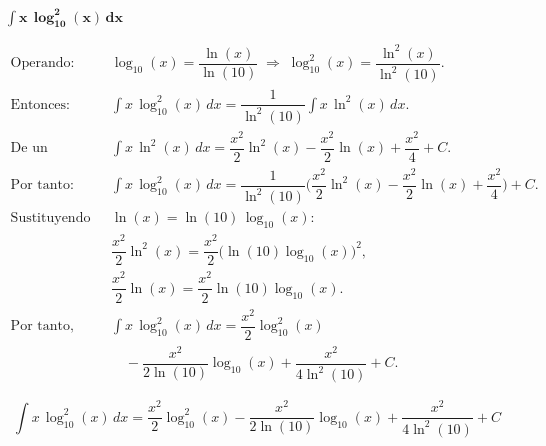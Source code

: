 $\displaystyle \mathbf{\int x\,\log_{10}^{2}(x)\,dx}$

\nopagebreak
$$
\begin{aligned}
\text{Operando: } &
\log_{10}(x) = \dfrac{\ln(x)}{\ln(10)} 
\;\Rightarrow\;
\log_{10}^{2}(x) = \dfrac{\ln^{2}(x)}{\ln^{2}(10)}. \\[6pt]
\text{Entonces: } &
\int x\,\log_{10}^{2}(x)\,dx
= \dfrac{1}{\ln^{2}(10)}\int x\,\ln^{2}(x)\,dx. \\[6pt]
\text{De un resultado previo (por partes): } &
\int x\,\ln^{2}(x)\,dx
= \dfrac{x^{2}}{2}\ln^{2}(x)
- \dfrac{x^{2}}{2}\ln(x)
+ \dfrac{x^{2}}{4} + C. \\[6pt]
\text{Por tanto: } &
\int x\,\log_{10}^{2}(x)\,dx
= \dfrac{1}{\ln^{2}(10)}
\Bigg(
\dfrac{x^{2}}{2}\ln^{2}(x)
- \dfrac{x^{2}}{2}\ln(x)
+ \dfrac{x^{2}}{4}
\Bigg) + C. \\[6pt]
\text{Sustituyendo } &\ln(x)=\ln(10)\,\log_{10}(x): \\[6pt]
&\dfrac{x^{2}}{2}\ln^{2}(x)
= \dfrac{x^{2}}{2}\big(\ln(10)\log_{10}(x)\big)^{2}, \\[3pt]
&\dfrac{x^{2}}{2}\ln(x)
= \dfrac{x^{2}}{2}\ln(10)\log_{10}(x). \\[8pt]
\text{Por tanto, simplificando: } &
\int x\,\log_{10}^{2}(x)\,dx
= \dfrac{x^{2}}{2}\log_{10}^{2}(x) \\[4pt]
&\quad - \dfrac{x^{2}}{2\ln(10)}\log_{10}(x)
+ \dfrac{x^{2}}{4\ln^{2}(10)} + C.
\end{aligned}
$$

$$
\boxed{\displaystyle 
\int x\,\log_{10}^{2}(x)\,dx
= \dfrac{x^{2}}{2}\log_{10}^{2}(x)
- \dfrac{x^{2}}{2\ln(10)}\log_{10}(x)
+ \dfrac{x^{2}}{4\ln^{2}(10)} + C}
$$
